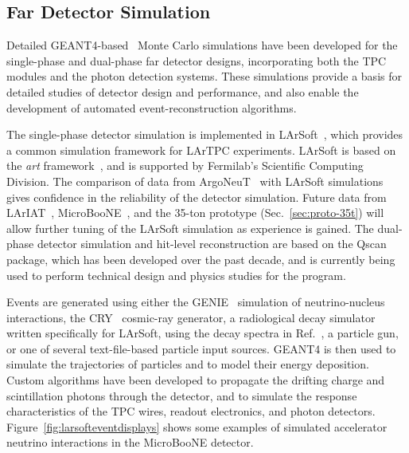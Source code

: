 \subsection{Far Detector Simulation}
\label{sec:detectors-sc-physics-software-simulation-fd}

Detailed GEANT4-based~\cite{GEANT4:NIM,GEANT4} Monte Carlo simulations have been 
developed for the single-phase and dual-phase far detector designs,
incorporating both the TPC modules
and the photon detection systems. These simulations provide
a basis for detailed studies of detector design and performance, 
and also enable the development of automated event-reconstruction algorithms.

The single-phase detector simulation is implemented in LArSoft~\cite{Church:2013hea},
which provides a common simulation framework for LArTPC experiments.
LArSoft is based on the {\it art} framework~\cite{Green:2012gv}, and is supported by Fermilab's
Scientific Computing Division.
The comparison of data from ArgoNeuT~\cite{Anderson:2012vc,Anderson:2012mra} with LArSoft
simulations gives confidence in the reliability of the detector simulation.
Future data from LArIAT~\cite{Adamson:2013/02/28tla,Cavanna:2014iqa},
MicroBooNE~\cite{Chen:2007ae,Jones:2011ci,microboonecdr}, and the 35-ton prototype (Sec.~\ref{sec:proto-35t}) will allow
further tuning of the LArSoft simulation as experience is gained.
The dual-phase detector simulation and hit-level reconstruction are based on the Qscan~\cite{lussi:thesis} package,
which has been developed over the past decade, and is currently
being used to perform technical design and physics studies for
the \cerndualproto{} program.  

Events are generated using either the GENIE~\cite{GENIE} simulation of 
neutrino-nucleus interactions, the CRY~\cite{Cosmic-CRY,Cosmic-CRY-protons,CRY-url} cosmic-ray generator, 
a radiological decay simulator written specifically for LArSoft, using the decay spectra
in Ref.~\cite{docdb-8797}, a particle gun, or one of several
text-file-based particle input sources. GEANT4 is then used to simulate the trajectories
of particles and to model their energy deposition.  
Custom algorithms have been developed to propagate the drifting charge
and scintillation photons through the detector, and to simulate the
response characteristics of the TPC wires, readout electronics, and photon detectors.
Figure~\ref{fig:larsofteventdisplays} shows some examples of simulated 
accelerator neutrino interactions in the MicroBooNE detector.

